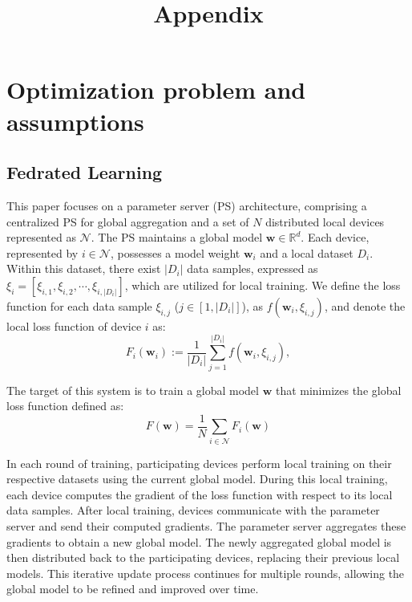 \documentclass{article}
\title{Appendix}
\begin{document}
\maketitle

\section{Optimization problem and assumptions}
\subsection{Fedrated Learning}\label{subsec:3.1FL}
This paper focuses on a parameter server (PS) architecture, comprising a centralized PS for global aggregation and a set of $N$ distributed local devices represented as $\mathcal{N}$. The PS maintains a global model $\mathbf{w} \in \mathbb{R}^d$. Each device, represented by $i \in \mathcal{N}$, possesses a model weight $\mathbf{w}_{i}$ and a local dataset $D_i$. Within this dataset, there exist $|D_i|$ data samples, expressed as $\xi_i = [\xi_{i,1}, \xi_{i,2}, \cdots, \xi_{i,|D_i|}]$, which are utilized for local training. We define the loss function for each data sample $\xi_{i,j}$ ($j \in [1,|D_i|]$), as $f(\mathbf{w}_i, \xi_{i,j})$,  and denote the local loss function of device $i$ as:
\begin{equation}
    F_i(\mathbf{w}_i) := \frac{1}{|D_i|} \sum_{j = 1}^{|D_i|} f(\mathbf{w}_i, \xi_{i,j}), 
\end{equation}

The target of this system is to train a global model $\mathbf{w}$ that minimizes the global loss function defined as:
\begin{equation}
    F(\mathbf{w}) = \frac{1}{N}\sum_{i \in \mathcal{N}}  F_i(\mathbf{w})
\end{equation}

In each round of training, participating devices perform local training on their respective datasets using the current global model. During this local training, each device computes the gradient of the loss function with respect to its local data samples. After local training, devices communicate with the parameter server and send their computed gradients. The parameter server aggregates these gradients to obtain a new global model. The newly aggregated global model is then distributed back to the participating devices, replacing their previous local models. This iterative update process continues for multiple rounds, allowing the global model to be refined and improved over time.
\end{document}
